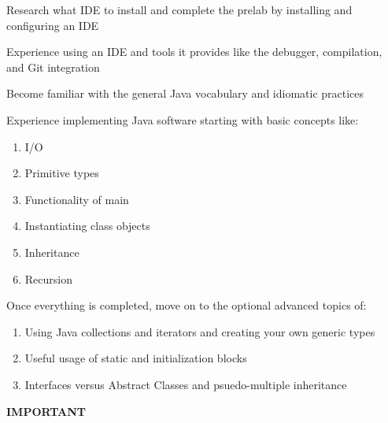 \documentclass[../../main.tex]{subfiles}
\begin{document}
\begin{steps}
   \item Research what IDE to install and complete the prelab by installing and configuring an IDE
   \item Experience using an IDE and tools it provides like the debugger, compilation, and Git
      integration
   \item Become familiar with the general Java vocabulary and idiomatic practices
   \item Experience implementing Java software starting with basic concepts like:
   \begin{enumerate}[label=\Alph*.]
         \item I/O
         \item Primitive types
         \item Functionality of main
         \item Instantiating class objects
         \item Inheritance
         \item Recursion
      \end{enumerate}
   \item Once everything is completed, move on to the optional advanced topics of:
   \begin{enumerate}[label=\Alph*.]
         \item Using Java collections and iterators and creating your own generic types
         \item Useful usage of static and initialization blocks
         \item Interfaces versus Abstract Classes and psuedo-multiple inheritance
      \end{enumerate}
\end{steps}

\vspace{5cm}

\begin{center}
   {\Huge\bfseries IMPORTANT}
\end{center}

\end{document}

